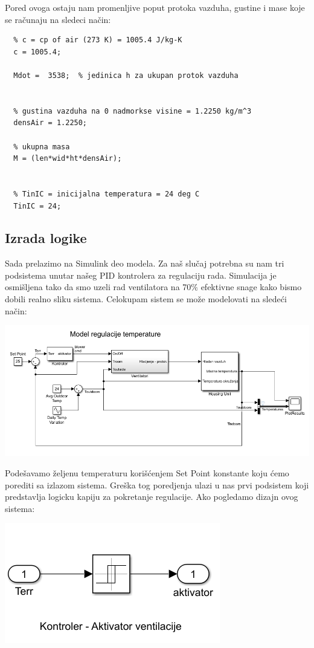 \documentclass[a4paper,11pt]{book}
\begin{document}
Pored ovoga ostaju nam promenljive poput protoka vazduha, gustine i mase koje se računaju na sledeci način:

\begin{lstlisting}
  % c = cp of air (273 K) = 1005.4 J/kg-K
  c = 1005.4;
  
  Mdot =  3538;  % jedinica h za ukupan protok vazduha
  
  
  % gustina vazduha na 0 nadmorkse visine = 1.2250 kg/m^3
  densAir = 1.2250;
  
  % ukupna masa
  M = (len*wid*ht*densAir);
  
  
  % TinIC = inicijalna temperatura = 24 deg C
  TinIC = 24;
  \end{lstlisting}


\subsection{Izrada logike}

Sada prelazimo na Simulink deo modela. Za naš slučaj potrebna su nam tri podsistema unutar našeg PID kontrolera za regulaciju rada. Simulacija je osmišljena tako da smo uzeli rad ventilatora na 70$\%$ efektivne snage kako bismo dobili realno sliku sistema. Celokupam sistem se može modelovati na sledeći način:

\includegraphics[width=\textwidth]{ceo.png}

Podešavamo željenu temperaturu korišćenjem Set Point konstante koju ćemo porediti sa izlazom sistema. Greška tog poredjenja ulazi u nas prvi podsistem koji predstavlja logicku kapiju za pokretanje regulacije. Ako pogledamo dizajn ovog sistema:

\includegraphics[width=\textwidth]{kont.png}
\end{document}

